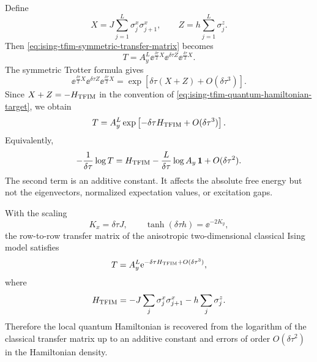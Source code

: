 Define
\begin{equation}
\label{eq:ising-tfim-ax-az-definitions}
    X
    =
    J\sum_{j=1}^{L}\sigma_j^x\sigma_{j+1}^x,
    \qquad
    Z
    =
    h\sum_{j=1}^{L}\sigma_j^z .
\end{equation}
Then \cref{eq:ising-tfim-symmetric-transfer-matrix} becomes
\begin{equation}
\label{eq:ising-tfim-symmetric-strang-product}
    T
    =
    A_y^L
    \ee^{\frac{\delta\tau}{2}X}
    \ee^{\delta\tau Z}
    \ee^{\frac{\delta\tau}{2}X} .
\end{equation}
The symmetric Trotter formula gives
\begin{equation}
\label{eq:ising-tfim-strang-expansion}
    \ee^{\frac{\delta\tau}{2}X}
    \ee^{\delta\tau Z}
    \ee^{\frac{\delta\tau}{2}X}
    =
    \exp\left[
        \delta\tau(X+Z)+O(\delta\tau^3)
    \right].
\end{equation}
Since $X+Z=-H_{\rm TFIM}$ in the convention of
\cref{eq:ising-tfim-quantum-hamiltonian-target}, we obtain
\begin{equation}
\label{eq:ising-tfim-transfer-hamiltonian-limit}
    T
    =
    A_y^L
    \exp\left[
        -\delta\tau H_{\rm TFIM}
        +O(\delta\tau^3)
    \right].
\end{equation}
Equivalently,
\begin{equation}
\label{eq:ising-tfim-effective-hamiltonian-expansion}
    -\frac{1}{\delta\tau}\log T
    =
    H_{\rm TFIM}
    -\frac{L}{\delta\tau}\log A_y\,\mathbf{1}
    +O(\delta\tau^2).
\end{equation}
The second term is an additive constant.  It affects the absolute free energy
but not the eigenvectors, normalized expectation values, or excitation gaps.

\begin{proposition}
\label{prop:ising-tfim-hamiltonian-limit}
With the scaling
\begin{equation}
    K_x=\delta\tau J,
    \qquad
    \tanh(\delta\tau h)=\ee^{-2K_y},
\end{equation}
the row-to-row transfer matrix of the anisotropic two-dimensional classical Ising
model satisfies
\begin{equation}
    T
    =
    A_y^L\mathrm{e}^{-\delta\tau H_{\rm TFIM}+O(\delta\tau^3)},
\end{equation}
where
\begin{equation}
    H_{\rm TFIM}
    =
    -J\sum_j\sigma_j^x\sigma_{j+1}^x
    -h\sum_j\sigma_j^z .
\end{equation}
Therefore the local quantum Hamiltonian is recovered from the logarithm of the
classical transfer matrix up to an additive constant and errors of order
$O(\delta\tau^2)$ in the Hamiltonian density.
\end{proposition}

